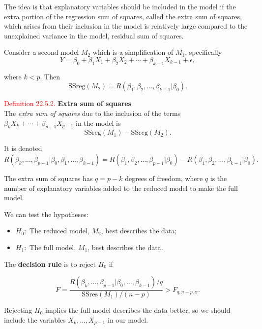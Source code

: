 \documentclass[
]{book}
\providecommand{\tightlist}{%
  \setlength{\itemsep}{0pt}\setlength{\parskip}{0pt}}
\begin{document}
The idea is that explanatory variables should be included in the model if the extra portion of the regression sum of squares, called the extra sum of squares, which arises from their inclusion in the model is relatively large compared to the unexplained variance in the model, residual sum of squares.

Consider a second model \(M_2\) which is a simplification of \(M_1\), specifically\\

\[Y = \beta_0 + \beta_1 X_1 + \beta_2 X_2 + \cdots + \beta_{k-1} X_{k-1} + \epsilon,\]

where \(k < p\). Then\\

\[\text{SSreg}(M_2) = R(\beta_1,\beta_2,\dots,\beta_{k-1} | \beta_0).\]

\hypertarget{Sec_Linear_ANOVA:def:ess}{}
\textcolor{red}{Definition 22.5.2.}
{\textbf{Extra sum of squares}}\\
The \emph{extra sum of squares} due to the inclusion of the terms \(\beta_k X_k + \cdots + \beta_{p-1} X_{p-1}\) in the model is\\

\[\text{SSreg}(M_1) - \text{SSreg}(M_2).\]

It is denoted\\

\[R(\beta_k,\dots,\beta_{p-1} | \beta_0,\beta_1,\dots,\beta_{k-1}) = R(\beta_1,\beta_2,\dots,\beta_{p-1} | \beta_0) - R(\beta_1,\beta_2,\dots,\beta_{k-1} | \beta_0). \]

The extra sum of squares has \(q=p-k\) degrees of freedom, where \(q\) is the number of explanatory variables added to the reduced model to make the full model.

We can test the hypotheses:

\begin{itemize}
\tightlist
\item
  \(H_0:\) The reduced model, \(M_2\), best describes the data;\\
\item
  \(H_1:\) The full model, \(M_1\), best describes the data.
\end{itemize}

The {\textbf{decision rule}} is to reject \(H_0\) if

\[ F = \frac{R(\beta_k,\dots,\beta_{p-1} |\beta_0,\dots,\beta_{k-1})/q}{\text{SSres}(M_1)/(n-p)} > F_{q,n-p,\alpha}.\]

Rejecting \(H_0\) implies the full model describes the data better, so we should include the variables \(X_k,\dots,X_{p-1}\) in our model.
\end{document}
